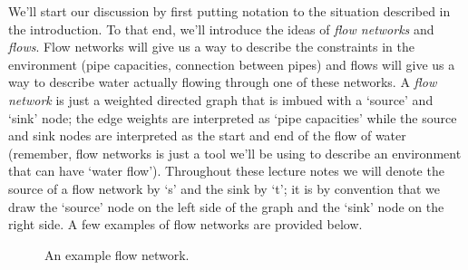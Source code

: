 \documentclass[11pt]{article}
\theoremstyle{plain}
\theoremstyle{definition}
\begin{document}
We'll start our discussion by first putting notation to the situation described in the introduction. To that end, we'll introduce the ideas of \emph{flow networks} and \emph{flows}. Flow networks will give us a way to describe the constraints in the environment (pipe capacities, connection between pipes) and flows will give us a way to describe water actually flowing through one of these networks. A \emph{flow network} is just a weighted directed graph that is imbued with a `source' and `sink' node; the edge weights are interpreted as `pipe capacities' while the source and sink nodes are interpreted as the start and end of the flow of water (remember, flow networks is just a tool we'll be using to describe an environment that can have `water flow'). Throughout these lecture notes we will denote the source of a flow network by `s' and the sink by `t'; it is by convention that we draw the `source' node on the left side of the graph and the `sink' node on the right side.  A few examples of flow networks are provided below.
\begin{figure}[h]
\caption{An example flow network.}
\centering
{}
\end{figure}
\end{document}
